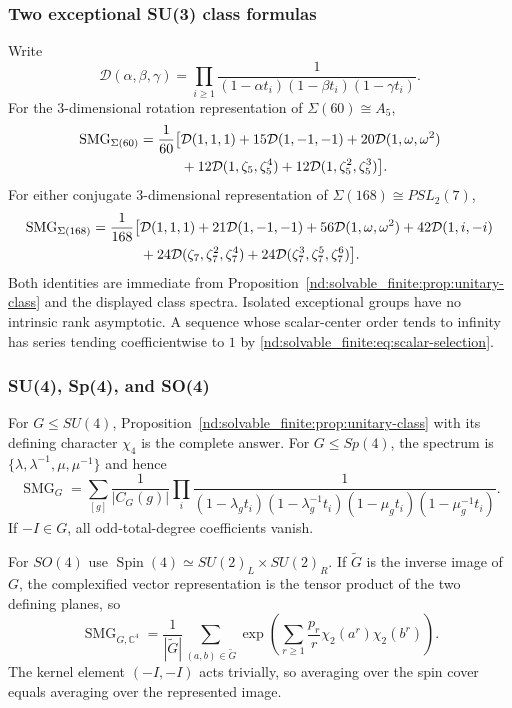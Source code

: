 \documentclass[10pt]{article}
\newcommand{\SMG}{\operatorname{SMG}}
\newcommand{\MGF}{\SMG}
\newcommand{\C}{\mathbb C}
\begin{document}
\subsubsection{Two exceptional SU(3) class formulas}

Write
\[
 \mathcal D(\alpha,\beta,\gamma)
 =\prod_{i\geq1}\frac1{(1-\alpha t_i)(1-\beta t_i)(1-\gamma t_i)}.
\]
For the $3$-dimensional rotation representation of
$\Sigma(60)\cong A_5$,
\begin{align}
 \MGF_{\Sigma(60)}=\frac1{60}\bigl[&
 \mathcal D(1,1,1)+15\mathcal D(1,-1,-1)
 +20\mathcal D(1,\omega,\omega^2)\notag\\
 &+12\mathcal D(1,\zeta_5,\zeta_5^4)
 +12\mathcal D(1,\zeta_5^2,\zeta_5^3)\bigr].
 \label{nd:solvable_finite:eq:a5-su3}
\end{align}
For either conjugate $3$-dimensional representation of
$\Sigma(168)\cong PSL_2(7)$,
\begin{align}
 \MGF_{\Sigma(168)}=\frac1{168}\bigl[&
 \mathcal D(1,1,1)+21\mathcal D(1,-1,-1)
 +56\mathcal D(1,\omega,\omega^2)
 +42\mathcal D(1,i,-i)\notag\\
 &+24\mathcal D(\zeta_7,\zeta_7^2,\zeta_7^4)
 +24\mathcal D(\zeta_7^3,\zeta_7^5,\zeta_7^6)\bigr].
 \label{nd:solvable_finite:eq:psl-su3}
\end{align}
Both identities are immediate from Proposition~\ref{nd:solvable_finite:prop:unitary-class} and
the displayed class spectra.  Isolated exceptional groups have no intrinsic
rank asymptotic.  A sequence whose scalar-center order tends to infinity has
series tending coefficientwise to $1$ by \eqref{nd:solvable_finite:eq:scalar-selection}.

\subsubsection{SU(4), Sp(4), and SO(4)}

For $G\leq SU(4)$, Proposition~\ref{nd:solvable_finite:prop:unitary-class} with its defining
character $\chi_4$ is the complete answer.  For $G\leq Sp(4)$, the spectrum
is $\{\lambda,\lambda^{-1},\mu,\mu^{-1}\}$ and hence
\[
 \MGF_G=\sum_{[g]}\frac1{|C_G(g)|}\prod_i
 \frac1{(1-\lambda_gt_i)(1-\lambda_g^{-1}t_i)
 (1-\mu_gt_i)(1-\mu_g^{-1}t_i)}.
\]
If $-I\in G$, all odd-total-degree coefficients vanish.

For $SO(4)$ use $\operatorname{Spin}(4)\simeq SU(2)_L\times SU(2)_R$.
If $\widetilde G$ is the inverse image of $G$, the complexified vector
representation is the tensor product of the two defining planes, so
\[
 \boxed{\MGF_{G,\C^4}
 =\frac1{|\widetilde G|}\sum_{(a,b)\in\widetilde G}
 \exp\!\left(\sum_{r\geq1}\frac{p_r}{r}
 \chi_2(a^r)\chi_2(b^r)\right).}
 \label{nd:solvable_finite:eq:so4-spin}
\]
The kernel element $(-I,-I)$ acts trivially, so averaging over the spin cover
equals averaging over the represented image.
\end{document}
